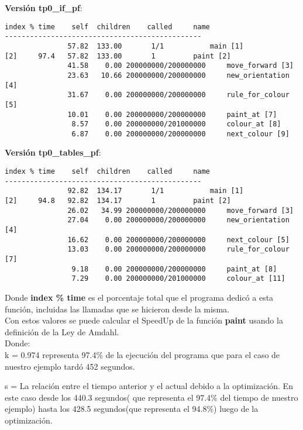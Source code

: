 \documentclass[a4paper, 10pt, twoside, notitlepage]{article}
\begin{document}
\textbf{Versión tp0\_if\_pf}:

\scriptsize
\begin{verbatim}
index % time    self  children    called     name
-----------------------------------------------
               57.82  133.00       1/1           main [1]
[2]     97.4   57.82  133.00       1         paint [2]
               41.58    0.00 200000000/200000000     move_forward [3]
               23.63   10.66 200000000/200000000     new_orientation [4]
               31.67    0.00 200000000/200000000     rule_for_colour [5]
               10.01    0.00 200000000/200000000     paint_at [7]
                8.57    0.00 200000000/201000000     colour_at [8]
                6.87    0.00 200000000/200000000     next_colour [9]
\end{verbatim}
\normalsize

\textbf{Versión tp0\_tables\_pf}:

\scriptsize
\begin{verbatim}
index % time    self  children    called     name
-----------------------------------------------
               92.82  134.17       1/1           main [1]
[2]     94.8   92.82  134.17       1         paint [2]
               26.02   34.99 200000000/200000000     move_forward [3]
               27.04    0.00 200000000/200000000     new_orientation [4]
               16.62    0.00 200000000/200000000     next_colour [5]
               13.03    0.00 200000000/200000000     rule_for_colour [7]
                9.18    0.00 200000000/200000000     paint_at [8]
                7.29    0.00 200000000/201000000     colour_at [11]
\end{verbatim}
\normalsize

Donde \textbf{index \% time} es el porcentaje total que el programa dedicó a esta función, incluidas las llamadas que se hicieron desde la misma.\\

Con estos valores se puede calcular el SpeedUp de la función \textbf{paint} usando la definición de la Ley de Amdahl.\\

Donde:\\

k = 0.974 representa 97.4\% de la ejecución del programa que para el caso de nuestro ejemplo tardó 452 segundos.

s = La relación entre el tiempo anterior y el actual debido a la optimización. En este caso desde los 440.3 segundos( que representa el 97.4\% del tiempo de nuestro ejemplo) hasta los 428.5 segundos(que representa el 94.8\%) luego de la optimización.\\
\end{document}
